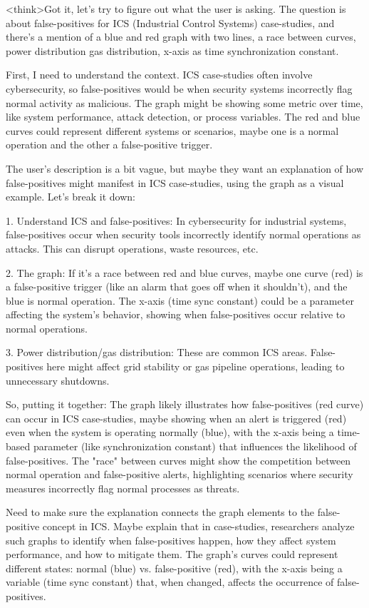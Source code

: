 <think>Got it, let's try to figure out what the user is asking. The question is about false-positives for ICS (Industrial Control Systems) case-studies, and there's a mention of a blue and red graph with two lines, a race between curves, power distribution gas distribution, x-axis as time synchronization constant. 

First, I need to understand the context. ICS case-studies often involve cybersecurity, so false-positives would be when security systems incorrectly flag normal activity as malicious. The graph might be showing some metric over time, like system performance, attack detection, or process variables. The red and blue curves could represent different systems or scenarios, maybe one is a normal operation and the other a false-positive trigger. 

The user's description is a bit vague, but maybe they want an explanation of how false-positives might manifest in ICS case-studies, using the graph as a visual example. Let's break it down:

1. Understand ICS and false-positives: In cybersecurity for industrial systems, false-positives occur when security tools incorrectly identify normal operations as attacks. This can disrupt operations, waste resources, etc.

2. The graph: If it's a race between red and blue curves, maybe one curve (red) is a false-positive trigger (like an alarm that goes off when it shouldn't), and the blue is normal operation. The x-axis (time sync constant) could be a parameter affecting the system's behavior, showing when false-positives occur relative to normal operations.

3. Power distribution/gas distribution: These are common ICS areas. False-positives here might affect grid stability or gas pipeline operations, leading to unnecessary shutdowns.

So, putting it together: The graph likely illustrates how false-positives (red curve) can occur in ICS case-studies, maybe showing when an alert is triggered (red) even when the system is operating normally (blue), with the x-axis being a time-based parameter (like synchronization constant) that influences the likelihood of false-positives. The "race" between curves might show the competition between normal operation and false-positive alerts, highlighting scenarios where security measures incorrectly flag normal processes as threats.

Need to make sure the explanation connects the graph elements to the false-positive concept in ICS. Maybe explain that in case-studies, researchers analyze such graphs to identify when false-positives happen, how they affect system performance, and how to mitigate them. The graph's curves could represent different states: normal (blue) vs. false-positive (red), with the x-axis being a variable (time sync constant) that, when changed, affects the occurrence of false-positives.


